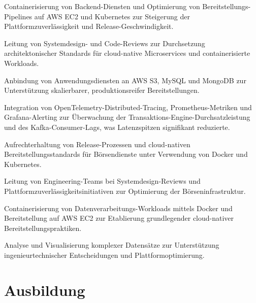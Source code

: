 \documentclass[10pt,a4paper]{resume}
\begin{document}
\bullets
  \item Containerisierung von Backend-Diensten und Optimierung von Bereitstellungs-Pipelines auf AWS EC2 und Kubernetes zur Steigerung der Plattformzuverlässigkeit und Release-Geschwindigkeit.
  \item Leitung von Systemdesign- und Code-Reviews zur Durchsetzung architektonischer Standards für cloud-native Microservices und containerisierte Workloads.
  \item Anbindung von Anwendungsdiensten an AWS S3, MySQL und MongoDB zur Unterstützung skalierbarer, produktionsreifer Bereitstellungen.
\bulletsend
\vspace{1.5pt}
\bullets
  \item Integration von OpenTelemetry-Distributed-Tracing, Prometheus-Metriken und Grafana-Alerting zur Überwachung der Transaktions-Engine-Durchsatzleistung und des Kafka-Consumer-Lags, was Latenzspitzen signifikant reduzierte.
  \item Aufrechterhaltung von Release-Prozessen und cloud-nativen Bereitstellungsstandards für Börsendienste unter Verwendung von Docker und Kubernetes.
  \item Leitung von Engineering-Teams bei Systemdesign-Reviews und Plattformzuverlässigkeitsinitiativen zur Optimierung der Börseninfrastruktur.
\bulletsend
\vspace{1.5pt}
\bullets
  \item Containerisierung von Datenverarbeitungs-Workloads mittels Docker und Bereitstellung auf AWS EC2 zur Etablierung grundlegender cloud-nativer Bereitstellungspraktiken.
  \item Analyse und Visualisierung komplexer Datensätze zur Unterstützung ingenieurtechnischer Entscheidungen und Plattformoptimierung.
\bulletsend
\vspace{1.5pt}

\section{Ausbildung}

\vspace{2pt}
\end{document}
